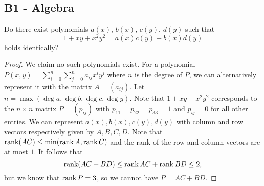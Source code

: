 \documentclass[11pt]{scrartcl}
\newcommand{\<}{\langle}
\renewcommand{\>}{\rangle}
\begin{document}
\subsection{B1 - Algebra}
Do there exist polynomials $a(x)$, $b(x)$, $c(y)$, $d(y)$ such that\[1 + xy + x^2y^2= a(x)c(y) + b(x)d(y)\]holds identically?
\begin{proof}
We claim no such polynomials exist.  
For a polynomial $P(x, y) = \sum_{i=0}^n \sum_{j=0}^n a_{ij} x^i y^j$ where $n$ is the degree of $P$, we can alternatively represent it with the matrix $A = (a_{ij})$.  Let $n = \max (\deg a, \deg b, \deg c, \deg y)$.  Note that $1 + xy + x^2y^2$ corresponds to the $n \times n$ matrix $P = (p_{ij})$ with $p_{11} = p_{22} =p_{33} = 1$ and $p_{ij} = 0$ for all other entries.  We can represent $a(x), b(x), c(y), d(y)$ with column and row vectors respectively given by $A, B, C, D$.  Note that $\operatorname{rank}(AC) \le \min(\operatorname{rank} A, \operatorname{rank} C)$ and the rank of the row and column vectors are at most $1$.  It follows that 
$$\operatorname{rank}(AC + BD) \le \operatorname{rank}{AC} + \operatorname{rank}{BD} \le 2,$$
but we know that $\operatorname{rank} P = 3$, so we cannot have $P = AC + BD$.
\end{proof}
\pagebreak
\end{document}
